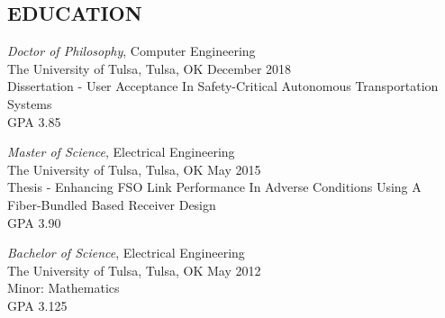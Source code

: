 \documentclass[line]{res} %
\begin{document}
\address{xxxx E. xxx St., Tulsa, OK xxxxx \hspace{3.72in} (xxx) xxx-xxxx}

\begin{resume}

\vspace{-10pt}

\section{EDUCATION}
\vspace{8pt} %

{\sl Doctor of Philosophy}, 
Computer Engineering \\ 
The University of Tulsa, Tulsa, OK \hfill December 2018 \\ 
Dissertation - User Acceptance In Safety-Critical Autonomous Transportation Systems \\
GPA 3.85 

{\sl Master of Science}, 
Electrical Engineering \\ 
The University of Tulsa, Tulsa, OK \hfill May 2015 \\ 
Thesis - Enhancing FSO Link Performance In Adverse Conditions Using A 
\\ \hspace*{.75in} Fiber-Bundled Based Receiver Design \\
GPA 3.90 

{\sl Bachelor of Science}, Electrical Engineering \\ 
The University of Tulsa, Tulsa, OK \hfill May 2012 \\
Minor: Mathematics \\
GPA 3.125

\vspace{0.2in} %


\end{resume}
\end{document}
